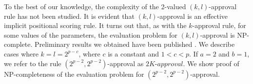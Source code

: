 To the best of our knowledge, the complexity of the 2-valued $(k,l)$-approval 
rule has not been studied. It is evident that $(k,l)$-approval is an effective
implicit positional scoring rule. It turns out that, as with the $k$-approval 
rule, for some values of the parameters, the evaluation problem for 
$(k,l)$-approval is NP-complete. Preliminary results we obtained 
have been published \cite{conf/adt13/LiuT}.
We describe cases where $k=l=2^{p-c}$,
where $c$ is a constant and $1<c<p$.
If $a=2$ and $b=1$, we refer to the rule 
$(2^{p-2},2^{p-2})$-approval as $2K$-$approval$.
We show proof of NP-completeness of the evaluation problem for
$(2^{p-2},2^{p-2})$-approval.

